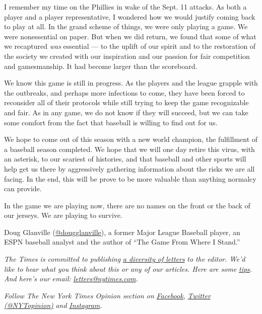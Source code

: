 I remember my time on the Phillies in wake of the Sept. 11 attacks. As
both a player and a player representative, I wondered how we would
justify coming back to play at all. In the grand scheme of things, we
were only playing a game. We were nonessential on paper. But when we did
return, we found that some of what we recaptured \emph{was} essential
--- to the uplift of our spirit and to the restoration of the society we
created with our inspiration and our passion for fair competition and
gamesmanship. It had become larger than the scoreboard.

We know this game is still in progress. As the players and the league
grapple with the outbreaks, and perhaps more infections to come, they
have been forced to reconsider all of their protocols while still trying
to keep the game recognizable and fair. As in any game, we do not know
if they will succeed, but we can take some comfort from the fact that
baseball is willing to find out for us.

We hope to come out of this season with a new world champion, the
fulfillment of a baseball season completed. We hope that we will one day
retire this virus, with an asterisk, to our scariest of histories, and
that baseball and other sports will help get us there by aggressively
gathering information about the risks we are all facing. In the end,
this will be prove to be more valuable than anything normalcy can
provide.

In the game we are playing now, there are no names on the front or the
back of our jerseys. We are playing to survive.

Doug Glanville
(\href{https://twitter.com/dougglanville}{@dougglanville}), a former
Major League Baseball player, an ESPN baseball analyst and the author of
``The Game From Where I Stand.''

\emph{The Times is committed to publishing}
\href{https://www.nytimes.com/2019/01/31/opinion/letters/letters-to-editor-new-york-times-women.html}{\emph{a
diversity of letters}} \emph{to the editor. We'd like to hear what you
think about this or any of our articles. Here are some}
\href{https://help.nytimes.com/hc/en-us/articles/115014925288-How-to-submit-a-letter-to-the-editor}{\emph{tips}}\emph{.
And here's our email:}
\href{mailto:letters@nytimes.com}{\emph{letters@nytimes.com}}\emph{.}

\emph{Follow The New York Times Opinion section on}
\href{https://www.facebook.com/nytopinion}{\emph{Facebook}}\emph{,}
\href{http://twitter.com/NYTOpinion}{\emph{Twitter (@NYTopinion)}}
\emph{and}
\href{https://www.instagram.com/nytopinion/}{\emph{Instagram}}\emph{.}

